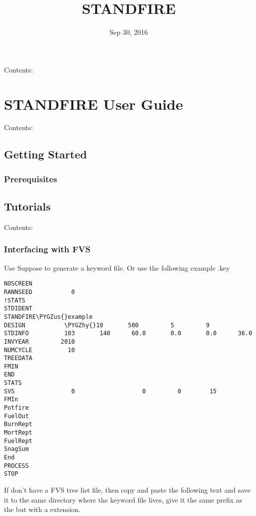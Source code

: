 \documentclass[letterpaper,10pt,english]{sphinxmanual}
\title{STANDFIRE}
\date{Sep 30, 2016}
\author{}
\def\PYGZus{\char`\_}
\def\PYGZhy{\char`\-}
\begin{document}
\maketitle
\tableofcontents
{}\label{index::doc}


Contents:


\chapter{STANDFIRE User Guide}
\label{user_guide:standfire-user-guide}\label{user_guide::doc}\label{user_guide:welcome-to-standfire}
Contents:


\section{Getting Started}
\label{getting_started:getting-started}\label{getting_started::doc}

\subsection{Prerequisites}
\label{getting_started:prerequisites}

\section{Tutorials}
\label{tutorials:tutorials}\label{tutorials::doc}
Contents:


\subsection{Interfacing with FVS}
\label{interfacing_with_fvs:interfacing-with-fvs}\label{interfacing_with_fvs::doc}
Use Suppose to generate a keyword file. Or use the following example .key

\begin{Verbatim}[commandchars=\\\{\}]
NOSCREEN
RANNSEED           0
!STATS
STDIDENT
STANDFIRE\PYGZus{}example
DESIGN           \PYGZhy{}10       500         5         9
STDINFO          103       140      60.0       0.0       0.0      36.0
INVYEAR         2010
NUMCYCLE          10
TREEDATA
FMIN
END
STATS
SVS                0                   0         0        15
FMIn
Potfire
FuelOut
BurnRept
MortRept
FuelRept
SnagSum
End
PROCESS
STOP
\end{Verbatim}

If don't have a FVS tree list file, then copy and paste the following text and save  it to the same directory where the keyword file lives, give it the same prefix as the  but with a  extension.
\end{document}
